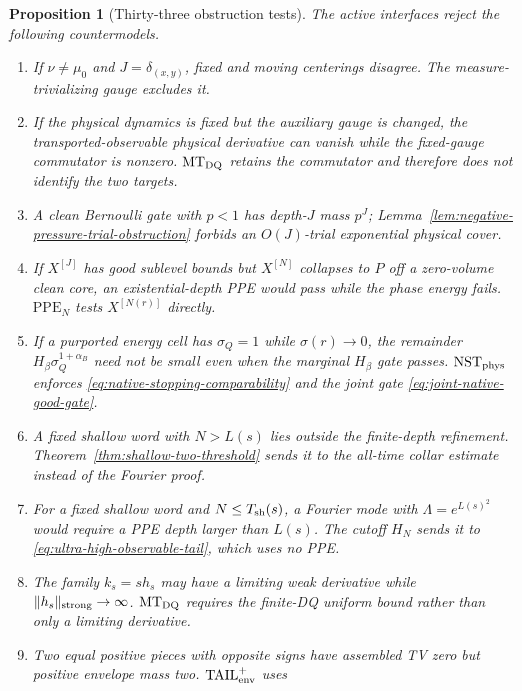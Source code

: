 \documentclass[11pt]{article}
\newtheorem{proposition}[theorem]{Proposition}
\begin{document}
\begin{proposition}[Thirty-three obstruction tests]
\label{prop:v39-obstruction-tests}
The active interfaces reject the following countermodels.
\begin{enumerate}[label=\textup{(T\arabic*)}]
\item If $\nu\ne\mu_0$ and $J=\delta_{(x,y)}$, fixed and moving
      centerings disagree.  The measure-trivializing gauge excludes it.
\item If the physical dynamics is fixed but the auxiliary gauge is changed,
      the transported-observable physical derivative can vanish while the
      fixed-gauge commutator is nonzero.  $\mathrm{MT}_{\rm DQ}$ retains the
      commutator and therefore does not identify the two targets.
\item A clean Bernoulli gate with $p<1$ has depth-$J$ mass $p^J$;
      Lemma~\ref{lem:negative-pressure-trial-obstruction} forbids an
      $O(J)$-trial exponential physical cover.
\item If $X^{[J]}$ has good sublevel bounds but $X^{[N]}$ collapses to $P$
      off a zero-volume clean core, an existential-depth PPE would pass while
      the phase energy fails.  $\mathrm{PPE}_{N}$ tests $X^{[N(r)]}$
      directly.
\item If a purported energy cell has $\sigma_Q=1$ while
      $\sigma(r)\to0$, the remainder
      $H_\beta\sigma_Q^{1+\alpha_B}$ need not be small even when the
      marginal $H_\beta$ gate passes.  $\mathrm{NST}_{\rm phys}$ enforces
      \eqref{eq:native-stopping-comparability} and the joint gate
      \eqref{eq:joint-native-good-gate}.
\item A fixed shallow word with $N>L(s)$ lies outside the finite-depth
      refinement.  Theorem~\ref{thm:shallow-two-threshold} sends it to the
      all-time collar estimate instead of the Fourier proof.
\item For a fixed shallow word and $N\le T_{\rm sh}(s)$, a Fourier mode with
      $\Lambda=e^{L(s)^2}$ would require a PPE depth larger than $L(s)$.
      The cutoff $H_N$ sends it to
      \eqref{eq:ultra-high-observable-tail}, which uses no PPE.
\item The family $k_s=s h_s$ may have a limiting weak derivative while
      $\|h_s\|_{\rm strong}\to\infty$.  $\mathrm{MT}_{\rm DQ}$
      requires the finite-DQ uniform bound rather than only a limiting
      derivative.
\item Two equal positive pieces with opposite signs have assembled TV zero
      but positive envelope mass two.  $\mathrm{TAIL}_{\rm env}^{+}$ uses

\end{enumerate}
\end{proposition}
\end{document}
